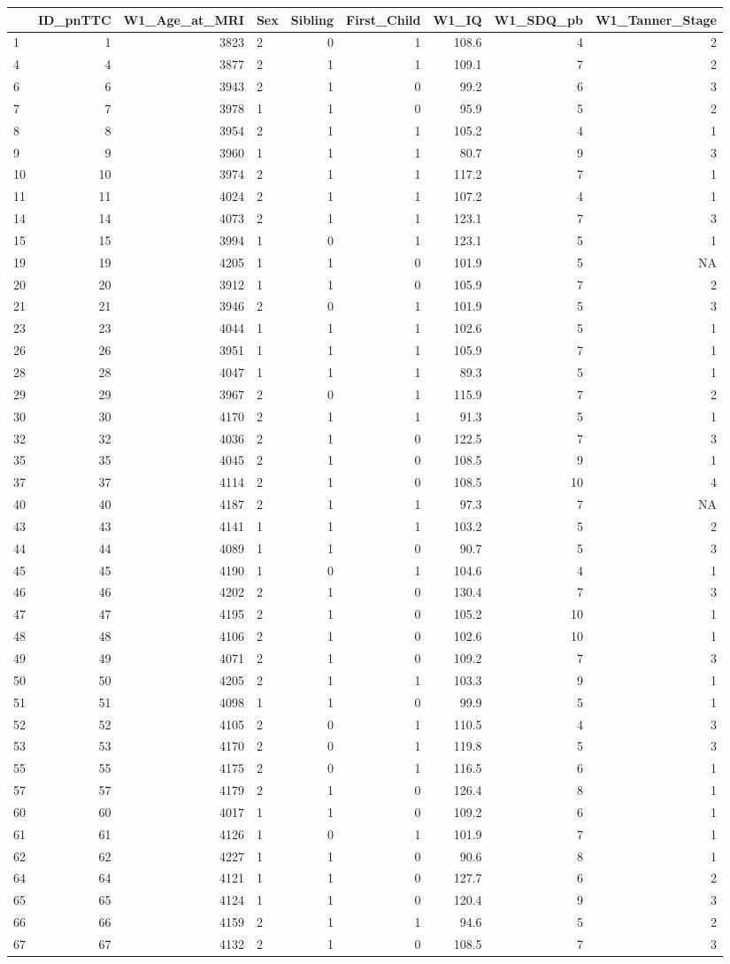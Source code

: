 \documentclass[]{article}
\begin{document}
\begin{longtable}[]{@{}lrrlrrrrr@{}}
\toprule
& ID\_pnTTC & W1\_Age\_at\_MRI & Sex & Sibling & First\_Child & W1\_IQ &
W1\_SDQ\_pb & W1\_Tanner\_Stage\tabularnewline
\midrule
\endhead
1 & 1 & 3823 & 2 & 0 & 1 & 108.6 & 4 & 2\tabularnewline
4 & 4 & 3877 & 2 & 1 & 1 & 109.1 & 7 & 2\tabularnewline
6 & 6 & 3943 & 2 & 1 & 0 & 99.2 & 6 & 3\tabularnewline
7 & 7 & 3978 & 1 & 1 & 0 & 95.9 & 5 & 2\tabularnewline
8 & 8 & 3954 & 2 & 1 & 1 & 105.2 & 4 & 1\tabularnewline
9 & 9 & 3960 & 1 & 1 & 1 & 80.7 & 9 & 3\tabularnewline
10 & 10 & 3974 & 2 & 1 & 1 & 117.2 & 7 & 1\tabularnewline
11 & 11 & 4024 & 2 & 1 & 1 & 107.2 & 4 & 1\tabularnewline
14 & 14 & 4073 & 2 & 1 & 1 & 123.1 & 7 & 3\tabularnewline
15 & 15 & 3994 & 1 & 0 & 1 & 123.1 & 5 & 1\tabularnewline
19 & 19 & 4205 & 1 & 1 & 0 & 101.9 & 5 & NA\tabularnewline
20 & 20 & 3912 & 1 & 1 & 0 & 105.9 & 7 & 2\tabularnewline
21 & 21 & 3946 & 2 & 0 & 1 & 101.9 & 5 & 3\tabularnewline
23 & 23 & 4044 & 1 & 1 & 1 & 102.6 & 5 & 1\tabularnewline
26 & 26 & 3951 & 1 & 1 & 1 & 105.9 & 7 & 1\tabularnewline
28 & 28 & 4047 & 1 & 1 & 1 & 89.3 & 5 & 1\tabularnewline
29 & 29 & 3967 & 2 & 0 & 1 & 115.9 & 7 & 2\tabularnewline
30 & 30 & 4170 & 2 & 1 & 1 & 91.3 & 5 & 1\tabularnewline
32 & 32 & 4036 & 2 & 1 & 0 & 122.5 & 7 & 3\tabularnewline
35 & 35 & 4045 & 2 & 1 & 0 & 108.5 & 9 & 1\tabularnewline
37 & 37 & 4114 & 2 & 1 & 0 & 108.5 & 10 & 4\tabularnewline
40 & 40 & 4187 & 2 & 1 & 1 & 97.3 & 7 & NA\tabularnewline
43 & 43 & 4141 & 1 & 1 & 1 & 103.2 & 5 & 2\tabularnewline
44 & 44 & 4089 & 1 & 1 & 0 & 90.7 & 5 & 3\tabularnewline
45 & 45 & 4190 & 1 & 0 & 1 & 104.6 & 4 & 1\tabularnewline
46 & 46 & 4202 & 2 & 1 & 0 & 130.4 & 7 & 3\tabularnewline
47 & 47 & 4195 & 2 & 1 & 0 & 105.2 & 10 & 1\tabularnewline
48 & 48 & 4106 & 2 & 1 & 0 & 102.6 & 10 & 1\tabularnewline
49 & 49 & 4071 & 2 & 1 & 0 & 109.2 & 7 & 3\tabularnewline
50 & 50 & 4205 & 2 & 1 & 1 & 103.3 & 9 & 1\tabularnewline
51 & 51 & 4098 & 1 & 1 & 0 & 99.9 & 5 & 1\tabularnewline
52 & 52 & 4105 & 2 & 0 & 1 & 110.5 & 4 & 3\tabularnewline
53 & 53 & 4170 & 2 & 0 & 1 & 119.8 & 5 & 3\tabularnewline
55 & 55 & 4175 & 2 & 0 & 1 & 116.5 & 6 & 1\tabularnewline
57 & 57 & 4179 & 2 & 1 & 0 & 126.4 & 8 & 1\tabularnewline
60 & 60 & 4017 & 1 & 1 & 0 & 109.2 & 6 & 1\tabularnewline
61 & 61 & 4126 & 1 & 0 & 1 & 101.9 & 7 & 1\tabularnewline
62 & 62 & 4227 & 1 & 1 & 0 & 90.6 & 8 & 1\tabularnewline
64 & 64 & 4121 & 1 & 1 & 0 & 127.7 & 6 & 2\tabularnewline
65 & 65 & 4124 & 1 & 1 & 0 & 120.4 & 9 & 3\tabularnewline
66 & 66 & 4159 & 2 & 1 & 1 & 94.6 & 5 & 2\tabularnewline
67 & 67 & 4132 & 2 & 1 & 0 & 108.5 & 7 & 3\tabularnewline

\end{longtable}
\end{document}
